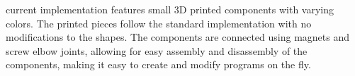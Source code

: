 \sculpt current implementation features small 3D printed components with varying colors.
The printed pieces follow the standard \sculpt implementation with no modifications to the shapes.
The components are connected using magnets and screw elbow joints, allowing for easy assembly and disassembly of the components, making it easy to create and modify programs on the fly.
\endinput